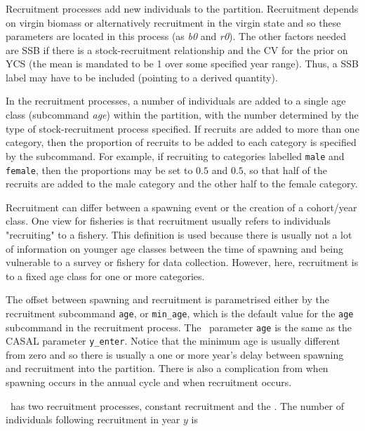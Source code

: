 \subsubsection{}\label{sec:Process-Recruitment}

Recruitment processes  add new individuals to the partition. Recruitment depends on virgin biomass or alternatively recruitment in the virgin state and so these parameters are located in this process (as \textit{b0} and \textit{r0}). The other factors needed are SSB if there is a stock-recruitment relationship and the CV for the prior on YCS (the mean is mandated to be 1 over some specified year range). Thus, a SSB label may have to be included (pointing to a derived quantity).

In the recruitment processes, a number of individuals are added to a single age class (subcommand \textit{age}) within the partition, with the number determined by the type of stock-recruitment process specified. If recruits are added to more than one category, then the proportion of recruits to be added to each category is specified by the  subcommand. For example, if recruiting to categories labelled \texttt{male} and \texttt{female}, then the proportions may be set to $0.5$ and $0.5$, so that half of the recruits are added to the male category and the other half to the female category.

Recruitment can differ between a spawning event or the creation of a cohort/year class. One view for fisheries is that recruitment usually refers to individuals "recruiting" to a fishery. This definition is used because there is usually not a lot of information on younger age classes between the time of spawning and being vulnerable to a survey or fishery for data collection. However, here, recruitment is to a fixed age class for one or more categories.

The offset between spawning and recruitment is parametrised either by the recruitment subcommand \texttt{age}, or \texttt{min\_age}, which is the default value for the \texttt{age} subcommand in the recruitment process. The \CNAME\ parameter \texttt{age} is the same as the CASAL parameter \texttt{y\_enter}. Notice that the minimum age is usually different from zero and so there is usually  a one or more year's delay between spawning and recruitment into the partition. There is also a complication from when spawning occurs in the annual cycle and when recruitment occurs.

\CNAME\ has two  recruitment processes, constant recruitment and the  \citep{1203}. The  number of individuals following recruitment in year $y$ is

